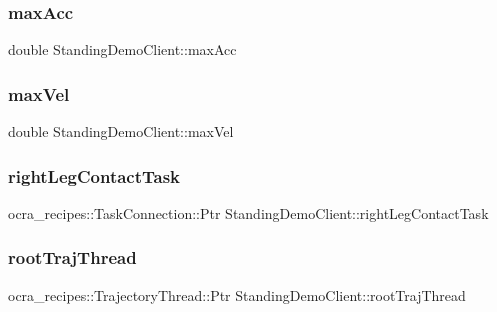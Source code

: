 \hypertarget{classStandingDemoClient_abc06fc0343cbca7a3faac4dbb1eaa842}{}\label{classStandingDemoClient_abc06fc0343cbca7a3faac4dbb1eaa842} 
\subsubsection{\texorpdfstring{max\+Acc}{maxAcc}}
{\footnotesize\ttfamily double Standing\+Demo\+Client\+::max\+Acc\hspace{0.3cm}{\ttfamily [private]}}

\hypertarget{classStandingDemoClient_a638e427aef4c4dc6fa38081ab5f9f405}{}\label{classStandingDemoClient_a638e427aef4c4dc6fa38081ab5f9f405} 
\subsubsection{\texorpdfstring{max\+Vel}{maxVel}}
{\footnotesize\ttfamily double Standing\+Demo\+Client\+::max\+Vel\hspace{0.3cm}{\ttfamily [private]}}

\hypertarget{classStandingDemoClient_ad53b834a0927d48917f5b6e830feb0f8}{}\label{classStandingDemoClient_ad53b834a0927d48917f5b6e830feb0f8} 
\subsubsection{\texorpdfstring{right\+Leg\+Contact\+Task}{rightLegContactTask}}
{\footnotesize\ttfamily ocra\+\_\+recipes\+::\+Task\+Connection\+::\+Ptr Standing\+Demo\+Client\+::right\+Leg\+Contact\+Task\hspace{0.3cm}{\ttfamily [private]}}

\hypertarget{classStandingDemoClient_a4f84e52d8be94fb7fae7a6c0ad8e8adb}{}\label{classStandingDemoClient_a4f84e52d8be94fb7fae7a6c0ad8e8adb} 
\subsubsection{\texorpdfstring{root\+Traj\+Thread}{rootTrajThread}}
{\footnotesize\ttfamily ocra\+\_\+recipes\+::\+Trajectory\+Thread\+::\+Ptr Standing\+Demo\+Client\+::root\+Traj\+Thread\hspace{0.3cm}{\ttfamily [private]}}


